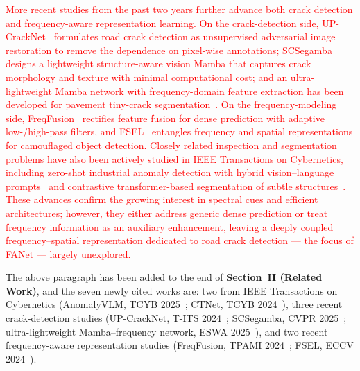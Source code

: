 \documentclass[lettersize,journal,onecolumn,12pt]{IEEEtran}
\begin{document}
\textcolor{red}{
More recent studies from the past two years further advance both crack detection and frequency-aware
representation learning. On the crack-detection side, UP-CrackNet~\cite{TITS24_UPCrackNet} formulates road crack
detection as unsupervised adversarial image restoration to remove the dependence on pixel-wise annotations;
SCSegamba~\cite{CVPR25_SCSegamba} designs a lightweight structure-aware vision Mamba that captures crack morphology
and texture with minimal computational cost; and an ultra-lightweight Mamba network with frequency-domain feature
extraction has been developed for pavement tiny-crack segmentation~\cite{ESWA25_MambaFreqCrack}.
On the frequency-modeling side, FreqFusion~\cite{TPAMI24_FreqFusion} rectifies feature fusion for dense prediction
with adaptive low-/high-pass filters, and FSEL~\cite{ECCV24_FSEL} entangles frequency and spatial representations
for camouflaged object detection. Closely related inspection and segmentation problems have also been actively
studied in IEEE Transactions on Cybernetics, including zero-shot industrial anomaly detection with hybrid
vision--language prompts~\cite{TCYB25_AnomalyVLM} and contrastive transformer-based segmentation of subtle
structures~\cite{TCYB24_CTNet}. These advances confirm the growing interest in spectral cues and efficient
architectures; however, they either address generic dense prediction or treat frequency information as an auxiliary
enhancement, leaving a deeply coupled frequency--spatial representation dedicated to road crack detection --- the
focus of FANet --- largely unexplored.
}

The above paragraph has been added to the end of \textbf{Section~II (Related Work)}, and the seven newly cited
works are: two from IEEE Transactions on Cybernetics
(AnomalyVLM, TCYB 2025~\cite{TCYB25_AnomalyVLM}; CTNet, TCYB 2024~\cite{TCYB24_CTNet}),
three recent crack-detection studies
(UP-CrackNet, T-ITS 2024~\cite{TITS24_UPCrackNet}; SCSegamba, CVPR 2025~\cite{CVPR25_SCSegamba};
ultra-lightweight Mamba--frequency network, ESWA 2025~\cite{ESWA25_MambaFreqCrack}),
and two recent frequency-aware representation studies
(FreqFusion, TPAMI 2024~\cite{TPAMI24_FreqFusion}; FSEL, ECCV 2024~\cite{ECCV24_FSEL}).\\[10pt]

\clearpage
\end{document}
